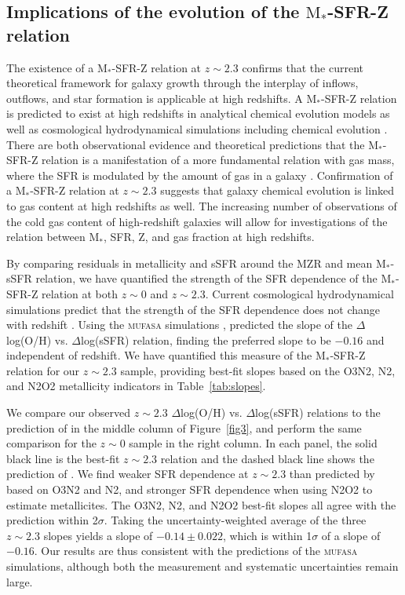 \documentclass[iop,twocolappendix]{emulateapj}
\newcommand{\mstar}{$\mbox{M}_*$}
\begin{document}
\subsection{Implications of the evolution of the \mstar-SFR-Z relation}

The existence of a \mstar-SFR-Z relation at $z\sim2.3$ confirms that the current theoretical
 framework for galaxy growth through the interplay of inflows, outflows, and star formation
 is applicable at high redshifts.  A \mstar-SFR-Z relation is predicted to exist
 at high redshifts in analytical chemical evolution models \citep{fin08,dav12,lil13} as well
 as cosmological hydrodynamical simulations including chemical evolution \citep{ma16,dav17,der17}.
  There are both observational evidence and theoretical predictions that the \mstar-SFR-Z relation
 is a manifestation of a more fundamental relation with gas mass, where the SFR is modulated by
 the amount of gas in a galaxy \citep{hug13,bot13,bot16b,bot16a,zah14a,ma16,dav17}.
  Confirmation of a \mstar-SFR-Z
 relation at $z\sim2.3$ suggests that galaxy chemical evolution is linked to gas content
 at high redshifts as well.  The increasing number of observations of the cold gas content of
 high-redshift galaxies \citep[e.g.,][]{tac13} will allow for investigations of the relation between
 \mstar, SFR, Z, and gas fraction at high redshifts.

By comparing residuals in metallicity and sSFR around the MZR and mean \mstar-sSFR relation,
 we have quantified the strength of the SFR dependence of the \mstar-SFR-Z relation
 at both $z\sim0$ and $z\sim2.3$.
  Current cosmological hydrodynamical simulations predict that the strength of
 the SFR dependence does not change with redshift \citep{dav17,der17}.
  Using the \textsc{mufasa} simulations \citep{dav16}, \citet{dav17} predicted the
 slope of the $\Delta$log(O/H) vs. $\Delta$log(sSFR) relation, finding the preferred slope to
 be $-0.16$ and independent of redshift.  We have quantified this measure of the \mstar-SFR-Z
 relation for our $z\sim2.3$ sample, providing best-fit slopes based on the O3N2, N2, and N2O2
 metallicity indicators in Table~\ref{tab:slopes}.

We compare our observed $z\sim2.3$
 $\Delta$log(O/H) vs. $\Delta$log(sSFR) relations to the prediction of \citet{dav17} in the
 middle column of Figure~\ref{fig3}, and perform the same comparison for the $z\sim0$
 sample in the right column.  In each panel, the solid black line is the best-fit $z\sim2.3$ relation
 and the dashed black line shows the prediction of \citet{dav17}.
  We find weaker SFR dependence at $z\sim2.3$ than predicted by \citet{dav17} based on O3N2 and N2,
 and stronger SFR dependence when using N2O2 to estimate metallicites.  The O3N2, N2, and N2O2
 best-fit slopes all agree with the \citet{dav17} prediction within 2$\sigma$.
  Taking the uncertainty-weighted average of the three $z\sim2.3$ slopes yields a slope of $-0.14\pm0.022$,
 which is within 1$\sigma$ of a slope of $-0.16$.  Our results are thus consistent with
 the predictions of the \textsc{mufasa} simulations, although both the measurement and
 systematic uncertainties remain large.
\end{document}
